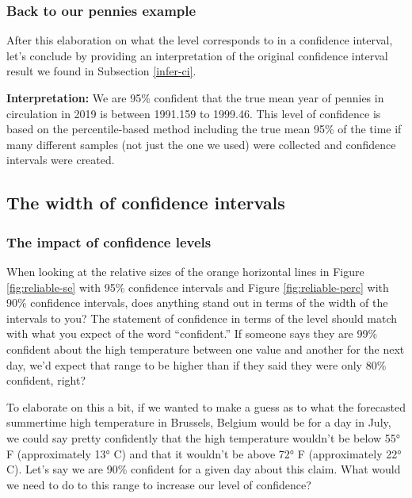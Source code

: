 \documentclass[12pt, krantz2,]{krantz}
\begin{document}
\hypertarget{back-to-our-pennies-example}{%
\subsubsection*{Back to our pennies example}\label{back-to-our-pennies-example}}


After this elaboration on what the level corresponds to in a confidence interval, let's conclude by providing an interpretation of the original confidence interval result we found in Subsection \ref{infer-ci}.

\textbf{Interpretation:} We are 95\% confident that the true mean year of pennies in circulation in 2019 is between 1991.159 to 1999.46. This level of confidence is based on the percentile-based method including the true mean 95\% of the time if many different samples (not just the one we used) were collected and confidence intervals were created.

\hypertarget{the-width-of-confidence-intervals}{%
\subsection*{The width of confidence intervals}\label{the-width-of-confidence-intervals}}


\hypertarget{the-impact-of-confidence-levels}{%
\subsubsection*{The impact of confidence levels}\label{the-impact-of-confidence-levels}}


When looking at the relative sizes of the orange horizontal lines in Figure \ref{fig:reliable-se} with 95\% confidence intervals and Figure \ref{fig:reliable-perc} with 90\% confidence intervals, does anything stand out in terms of the width of the intervals to you? The statement of confidence in terms of the level should match with what you expect of the word ``confident.'' If someone says they are 99\% confident about the high temperature between one value and another for the next day, we'd expect that range to be higher than if they said they were only 80\% confident, right?

To elaborate on this a bit, if we wanted to make a guess as to what the forecasted summertime high temperature in Brussels, Belgium would be for a day in July, we could say pretty confidently that the high temperature wouldn't be below 55° F (approximately 13° C) and that it wouldn't be above 72° F (approximately 22° C). Let's say we are 90\% confident for a given day about this claim. What would we need to do to this range to increase our level of confidence?
\end{document}
